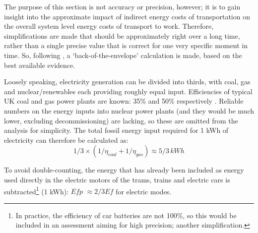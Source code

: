 \documentclass[a4paper, 11pt, twoside]{Thesis}
\begin{document}
The purpose of this section is not accuracy or precision, however; it is to
gain insight into the approximate impact of indirect energy costs of
transportation on the overall system level energy costs of transport to work.
Therefore, simplifications are made that should be
approximately right over a long time, rather than a single precise value that
is correct for one very specific moment in time. So, following
\citet{MacKay2009}, a `back-of-the-envelope' calculation is made, based on the
best available evidence.

Loosely speaking, electricity generation can be divided into thirds, with coal,
gas and nuclear/renewables each providing roughly equal input. Efficiencies of
typical UK coal and gas power plants are known: 35\% and 50\% respectively
\citep{Ecofys2006}.
Reliable numbers on the energy inputs into nuclear power plants
(and they would be much lower, excluding decommissioning)
are lacking, so these are omitted from the
analysis for simplicity. The total fossil energy input required for 1 kWh of
electricity can therefore be calculated as:
\begin{equation}
1/3 \times (1/\eta_{coal} + 1/\eta_{gas}) \approx 5/3\, kWh
\end{equation}

To avoid double-counting, the energy that has
already been included as energy used directly in the electric motors of the
trams, trains and electric cars is subtracted\footnote{In
practice, the efficiency of car batteries are not 100\%, so this would be
included in an assessment aiming for high precision; another simplification.
}
(1 kWh): $Efp$ $\approx 2/3 Ef$ for electric modes.
\end{document}
